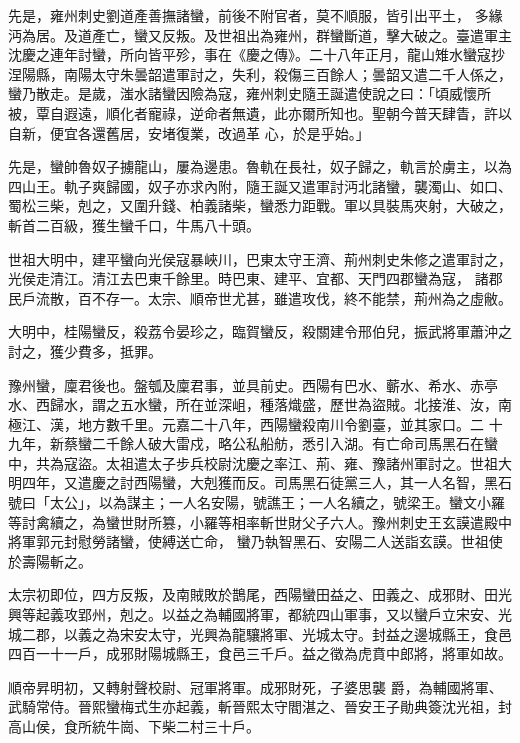 \begin{pinyinscope}
 先是，雍州刺史劉道產善撫諸蠻，前後不附官者，莫不順服，皆引出平土，
 多緣沔為居。及道產亡，蠻又反叛。及世祖出為雍州，群蠻斷道，擊大破之。臺遣軍主沈慶之連年討蠻，所向皆平殄，事在《慶之傳》。二十八年正月，龍山雉水蠻寇抄涅陽縣，南陽太守朱曇韶遣軍討之，失利，殺傷三百餘人；曇韶又遣二千人係之，蠻乃散走。是歲，滍水諸蠻因險為寇，雍州刺史隨王誕遣使說之曰：「頃威懷所被，覃自遐遠，順化者寵祿，逆命者無遺，此亦爾所知也。聖朝今普天肆眚，許以自新，便宜各還舊居，安堵復業，改過革
 心，於是乎始。」



 先是，蠻帥魯奴子擄龍山，屢為邊患。魯軌在長社，奴子歸之，軌言於虜主，以為四山王。軌子爽歸國，奴子亦求內附，隨王誕又遣軍討沔北諸蠻，襲濁山、如口、蜀松三柴，剋之，又圍升錢、柏義諸柴，蠻悉力距戰。軍以具裝馬夾射，大破之，斬首二百級，獲生蠻千口，牛馬八十頭。



 世祖大明中，建平蠻向光侯寇暴峽川，巴東太守王濟、荊州刺史朱修之遣軍討之，光侯走清江。清江去巴東千餘里。時巴東、建平、宜都、天門四郡蠻為寇，
 諸郡民戶流散，百不存一。太宗、順帝世尤甚，雖遣攻伐，終不能禁，荊州為之虛敝。



 大明中，桂陽蠻反，殺荔令晏珍之，臨賀蠻反，殺關建令邢伯兒，振武將軍蕭沖之討之，獲少費多，抵罪。



 豫州蠻，廩君後也。盤瓠及廩君事，並具前史。西陽有巴水、蘄水、希水、赤亭水、西歸水，謂之五水蠻，所在並深岨，種落熾盛，歷世為盜賊。北接淮、汝，南極江、漢，地方數千里。元嘉二十八年，西陽蠻殺南川令劉臺，並其家口。二
 十九年，新蔡蠻二千餘人破大雷戍，略公私船舫，悉引入湖。有亡命司馬黑石在蠻中，共為寇盜。太祖遣太子步兵校尉沈慶之率江、荊、雍、豫諸州軍討之。世祖大明四年，又遣慶之討西陽蠻，大剋獲而反。司馬黑石徒黨三人，其一人名智，黑石號曰「太公」，以為謀主；一人名安陽，號譙王；一人名續之，號梁王。蠻文小羅等討禽續之，為蠻世財所篡，小羅等相率斬世財父子六人。豫州刺史王玄謨遣殿中將軍郭元封慰勞諸蠻，使縛送亡命，
 蠻乃執智黑石、安陽二人送詣玄謨。世祖使於壽陽斬之。



 太宗初即位，四方反叛，及南賊敗於鵲尾，西陽蠻田益之、田義之、成邪財、田光興等起義攻郢州，剋之。以益之為輔國將軍，都統四山軍事，又以蠻戶立宋安、光城二郡，以義之為宋安太守，光興為龍驤將軍、光城太守。封益之邊城縣王，食邑四百一十一戶，成邪財陽城縣王，食邑三千戶。益之徵為虎賁中郎將，將軍如故。



 順帝昇明初，又轉射聲校尉、冠軍將軍。成邪財死，子婆思襲
 爵，為輔國將軍、武騎常侍。晉熙蠻梅式生亦起義，斬晉熙太守閻湛之、晉安王子勛典簽沈光祖，封高山侯，食所統牛崗、下柴二村三十戶。




\end{pinyinscope}
